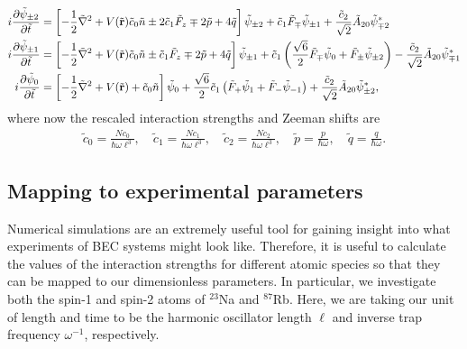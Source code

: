\begin{align}
    i\pdv{\tilde{\psi}_{\pm 2}}{\tilde{t}} &= \left[-\frac{1}{2}\tilde{\nabla}^2
    +V(\tilde{\vb{r}}) \tilde{c}_0\tilde{n} \pm 2\tilde{c}_1\tilde{F}_z
    \mp 2\tilde{p} + 4\tilde{q}\right]\tilde{\psi}_{\pm 2}
    + \tilde{c}_1\tilde{F}_\mp\tilde{\psi}_{\pm 1}
    + \frac{\tilde{c}_2}{\sqrt{2}}\tilde{A}_{20}\tilde{\psi}_{\mp 2}^* \\
    i\pdv{\tilde{\psi}_{\pm 1}}{\tilde{t}} &= \left[-\frac{1}{2}\tilde{\nabla}^2
    +V(\tilde{\vb{r}}) \tilde{c}_0\tilde{n} \pm \tilde{c}_1\tilde{F}_z
    \mp 2\tilde{p} + 4\tilde{q}\right]\tilde{\psi}_{\pm 1}
    +\tilde{c}_1\left(\frac{\sqrt{6}}{2}\tilde{F}_\mp \tilde{\psi}_0
    +\tilde{F}_\pm\tilde{\psi}_{\pm 2}\right)
    - \frac{\tilde{c}_2}{\sqrt{2}}\tilde{A}_{20}\tilde{\psi}_{\mp 1}^* \\
    i\pdv{\tilde{\psi}_0}{\tilde{t}} &= \left[-\frac{1}{2}\tilde{\nabla}^2
    +V(\tilde{\vb{r}})+\tilde{c}_0\tilde{n}\right]\tilde{\psi}_0
    +\frac{\sqrt{6}}{2}\tilde{c}_1\left(\tilde{F}_+\tilde{\psi}_1
    +\tilde{F}_-\tilde{\psi}_{-1}\right)
    + \frac{\tilde{c}_2}{\sqrt{2}}\tilde{A}_{20}\tilde{\psi}_{\pm 2}^*,
\end{align}
where now the rescaled interaction strengths and Zeeman shifts are
\begin{align}\label{eq: spin-2-interaction-strengths-dimensionless}
    \tilde{c}_0 = \frac{Nc_0}{\hbar\omega\ell^3}, \quad
    \tilde{c}_1 = \frac{Nc_1}{\hbar\omega\ell^3}, \quad
    \tilde{c}_2 = \frac{Nc_2}{\hbar\omega\ell^3}, \quad
    \tilde{p} = \frac{p}{\hbar\omega}, \quad
    \tilde{q} = \frac{q}{\hbar\omega}.
\end{align}

\subsection{Mapping to experimental parameters}
Numerical simulations are an extremely useful tool for gaining insight into
what experiments of BEC systems might look like.
Therefore, it is useful to calculate the values of the interaction strengths
for different atomic species so that they can be mapped to our dimensionless
parameters.
In particular, we investigate both the spin-1 and spin-2 atoms of \( ^{23}\)Na
and \( ^{87}\)Rb.
Here, we are taking our unit of length and time to be the harmonic oscillator
length \(\ell \) and inverse trap frequency \(\omega^{-1}\), respectively.


